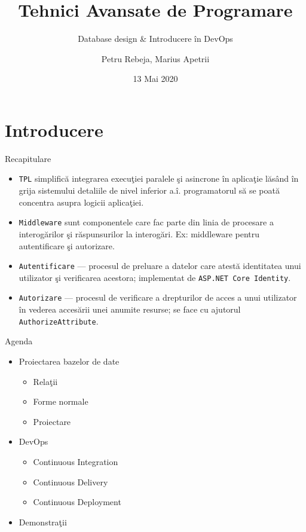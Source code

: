 \documentclass[presentation]{beamer}
\author{Petru Rebeja, Marius Apetrii}
\date{13 Mai 2020}
\title{Tehnici Avansate de Programare}
\subtitle{Database design \& Introducere în DevOps}
\institute[UAIC]{Facultatea de Matematică\\Universitatea Alexandru Ioan Cuza, Iași}
\begin{document}
\maketitle
\section{Introducere}
\label{sec:org65e2bcf}
\begin{frame}[label={sec:org38d15bc},fragile]{Recapitulare}
 \pause
\begin{itemize}
\item \texttt{TPL} simplifică integrarea execuţiei paralele şi asincrone în aplicaţie lăsând în grija sistemului detaliile de nivel inferior a.î. programatorul să se poată concentra asupra logicii aplicaţiei.
\end{itemize}
\pause
\begin{itemize}
\item \texttt{Middleware} sunt componentele care fac parte din linia de procesare a interogărilor şi răspunsurilor la interogări. Ex: middleware pentru autentificare şi autorizare.
\end{itemize}
\pause
\begin{itemize}
\item \texttt{Autentificare} --- procesul de preluare a datelor care atestă identitatea unui utilizator şi verificarea acestora; implementat de \texttt{ASP.NET Core Identity}.
\end{itemize}
\pause
\begin{itemize}
\item \texttt{Autorizare} --- procesul de verificare a drepturilor de acces a  unui utilizator în vederea accesării unei anumite resurse; se face cu ajutorul \texttt{AuthorizeAttribute}.
\end{itemize}
\end{frame}
\begin{frame}[label={sec:org36111b5}]{Agenda}
\begin{itemize}
\item Proiectarea bazelor de date
\begin{itemize}
\item Relaţii
\item Forme normale
\item Proiectare
\end{itemize}
\item DevOps
\begin{itemize}
\item Continuous Integration
\item Continuous Delivery
\item Continuous Deployment
\end{itemize}
\item Demonstraţii
\end{itemize}
\end{frame}
\end{document}
